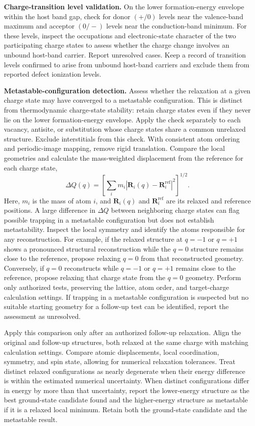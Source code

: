 \documentclass[aps,prmaterials,reprint,superscriptaddress]{revtex4-2}
\begin{document}
\textbf{Charge-transition level validation.}
On the lower formation-energy envelope within the host band gap, check for donor $(+/0)$ levels near the valence-band maximum and acceptor $(0/-)$ levels near the conduction-band minimum. For these levels, inspect the occupations and electronic-state character of the two participating charge states to assess whether the charge change involves an unbound host-band carrier. Report unresolved cases. Keep a record of transition levels confirmed to arise from unbound host-band carriers and exclude them from reported defect ionization levels.

\textbf{Metastable-configuration detection.}
Assess whether the relaxation at a given charge state may have converged to a metastable configuration. This is distinct from thermodynamic charge-state stability: retain charge states even if they never lie on the lower formation-energy envelope. Apply the check separately to each vacancy, antisite, or substitution whose charge states share a common unrelaxed structure. Exclude interstitials from this check. With consistent atom ordering and periodic-image mapping, remove rigid translation. Compare the local geometries and calculate the mass-weighted displacement \cite{Alkauskas2014} from the reference for each charge state,
\begin{equation}
\Delta Q(q)=\left[\sum_i m_i\left|\mathbf{R}_i(q)-\mathbf{R}_i^{\mathrm{ref}}\right|^2\right]^{1/2}.
\end{equation}
Here, $m_i$ is the mass of atom $i$, and $\mathbf{R}_i(q)$ and $\mathbf{R}_i^{\mathrm{ref}}$ are its relaxed and reference positions. A large difference in $\Delta Q$ between neighboring charge states can flag possible trapping in a metastable configuration but does not establish metastability. Inspect the local symmetry and identify the atoms responsible for any reconstruction. For example, if the relaxed structure at $q=-1$ or $q=+1$ shows a pronounced structural reconstruction while the $q=0$ structure remains close to the reference, propose relaxing $q=0$ from that reconstructed geometry. Conversely, if $q=0$ reconstructs while $q=-1$ or $q=+1$ remains close to the reference, propose relaxing that charge state from the $q=0$ geometry. Perform only authorized tests, preserving the lattice, atom order, and target-charge calculation settings. If trapping in a metastable configuration is suspected but no suitable starting geometry for a follow-up test can be identified, report the assessment as unresolved.

Apply this comparison only after an authorized follow-up relaxation. Align the original and follow-up structures, both relaxed at the same charge with matching calculation settings. Compare atomic displacements, local coordination, symmetry, and spin state, allowing for numerical relaxation tolerances. Treat distinct relaxed configurations as nearly degenerate when their energy difference is within the estimated numerical uncertainty. When distinct configurations differ in energy by more than that uncertainty, report the lower-energy structure as the best ground-state candidate found and the higher-energy structure as metastable if it is a relaxed local minimum. Retain both the ground-state candidate and the metastable result.
\end{document}
